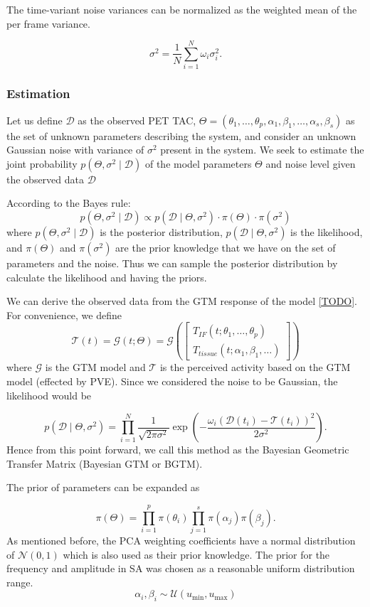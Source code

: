 The time-variant noise variances can be normalized as the weighted mean of the per frame variance.

\[
	\sigma^2= \frac{1}{N} \sum_{i=1}^{N} \omega_i \sigma_i^2.
\]


\subsubsection{Estimation}
Let us define  \(\mathcal{D}\) as the observed PET TAC, \( \Theta = (\theta_{1}, \dots,\theta_{p}, \alpha_{1}, \beta_{1}, \dots, \alpha_{s}, \beta_{s}) \) as the set of unknown parameters describing the system, and consider an unknown Gaussian noise with variance of $\sigma^2$ present in the system.
We seek to estimate the joint probability \(p(\Theta,\sigma^2\mid \mathcal{D})\) of the model parameters \(\Theta\) and noise level given the observed data \(\mathcal{D}\)

According to the Bayes rule:
\[
	p(\Theta,\sigma^2 \mid \mathcal{D}) \propto p(\mathcal{D} \mid \Theta,\sigma^2) \cdot \pi( \Theta ) \cdot \pi( \sigma^2)
\]
where  \(p(\Theta,\sigma^2 \mid \mathcal{D})\) is the posterior distribution, \(p(\mathcal{D} \mid \Theta,\sigma^2)\) is the likelihood, and $\pi(\Theta)$ and $\pi(\sigma^2)$ are the prior knowledge that we have on the set of parameters and the noise. Thus we can sample the posterior distribution by calculate the likelihood and having the priors.


We can derive the observed data from the GTM response of the model \ref{TODO}.
For convenience, we define
\[
	\mathcal{T}(t) = \mathcal{G}(t;\Theta) =
	\mathcal{G}\left(
	\begin{bmatrix}
			T_{IF}(t;\theta_{1}, \dots, \theta_{p}) \\
			T_{tissue}(t;\alpha_{1}, \beta_{1}, \dots)
		\end{bmatrix}\right)
\]
where $\mathcal{G}$ is the GTM model and $\mathcal{T}$ is the perceived activity based on the GTM model (effected by PVE). Since we considered the noise to be Gaussian, the likelihood would be

\[
	p(\mathcal{D} \mid \Theta,\sigma^2) = \prod_{i=1}^N \frac{1}{\sqrt{2\pi \sigma^2}} \exp\left( -\frac{\omega_i(\mathcal{D}(t_i) - \mathcal{T}(t_i))^2}{2\sigma^2} \right).
\]
Hence from this point forward, we call this method as the Bayesian Geometric Transfer Matrix (Bayesian GTM or BGTM).

The prior of parameters can be expanded as

\[
	\pi(\Theta) = \prod_{i=1}^p \pi(\theta_i)  \prod_{j=1}^s \pi(\alpha_j) \pi(\beta_j).
\]
As mentioned before, the PCA weighting coefficients have a normal distribution of $\mathcal{N}(0,1)$ which is also used as their prior knowledge.
The prior for the frequency and amplitude in SA was chosen as a reasonable uniform distribution range.
\[
	\alpha_i,\beta_i \sim \mathcal{U}( u_{\text{min}} , u_{\text{max}} )
\]

